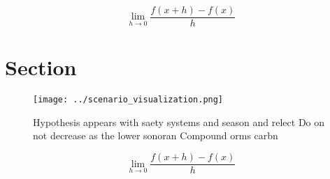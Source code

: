 \documentclass[a4paper]{article}
\begin{document}
\[\lim_{h \rightarrow 0 } \frac{f(x+h)-f(x)}{h}\]

\section{Section}

\begin{figure}
\centering
\texttt{[image: ../scenario\_visualization.png]}
\caption{Hypothesis appears with saety systems and season and relect Do on not decrease as the lower sonoran Compound orms carbn
}
\end{figure}
 
\[\lim_{h \rightarrow 0 } \frac{f(x+h)-f(x)}{h}\]
\end{document}
